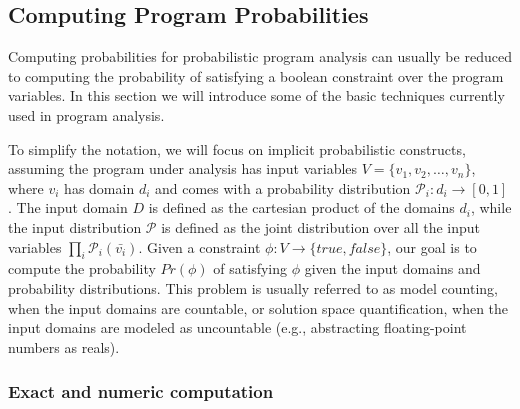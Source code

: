 \subsection{Computing Program Probabilities}
\label{sec:computingprobabilities}

Computing probabilities for probabilistic program analysis can usually be reduced to computing the probability of satisfying a boolean constraint over the program variables. In this section we will introduce some of the basic techniques currently used in program analysis. 

To simplify the notation, we will focus on implicit probabilistic constructs, assuming the program under analysis has input variables $V=\{v_1, v_2, \dots, v_n\}$, where $v_i$ has domain $d_i$ and comes with a probability distribution $\mathcal{P}_i: d_i \to [0, 1]$. The input domain $D$ is defined as the cartesian product of the domains $d_i$, while the input distribution $\mathcal{P}$ is defined as the joint distribution over all the input variables $\prod_i \mathcal{P}_i(\bar{v_i})$. Given a constraint $\phi: V \to \{true, false\}$, our goal is to compute the probability $Pr(\phi)$ of satisfying $\phi$ given the input domains and probability distributions. This problem is usually referred to as model counting, when the input domains are countable, or solution space quantification, when the input domains are modeled as uncountable (e.g., abstracting floating-point numbers as reals).

\subsubsection{Exact and numeric computation}\label{sec:computingprobabilitiesExact}

